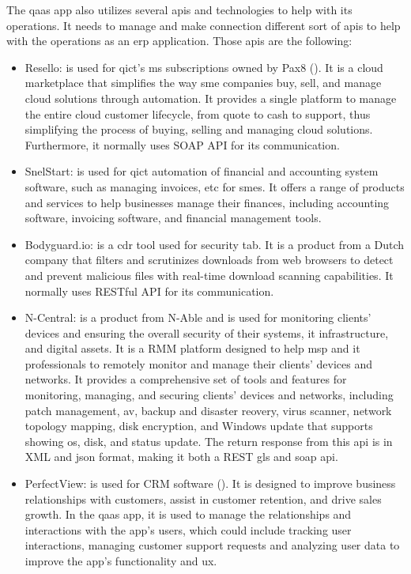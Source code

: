 The \acrshort{qaas} app also utilizes several \acrshort{api}s and technologies to help with its operations.
It needs to manage and make connection different sort of \acrshort{api}s to help with the operations as an
\acrshort{erp} application. Those \acrshort{api}s are the following:
\begin{itemize}
      \item Resello: is used for \acrshort{qict}'s \acrshort{ms} subscriptions owned by Pax8 (\textit{\cite{resello}}).
            It is a cloud marketplace that simplifies the way \acrshort{sme} companies buy, sell, and manage cloud solutions
            through automation. It provides a single platform to manage the entire cloud customer lifecycle, from
            quote to cash to support, thus simplifying the process of buying, selling and managing cloud
            solutions. Furthermore, it normally uses \gls{SOAP API} for its communication.
      \item SnelStart: is used for \acrshort{qict} automation of financial and accounting system software,
            such as managing invoices, \acrshort{etc} for \acrshort{sme}s. It offers a range of products and
            services to help businesses manage their finances, including accounting software, invoicing software, and financial management
            tools.
      \item Bodyguard.io: is a \acrshort{cdr} tool used for security tab. It is a product from a Dutch company
            that filters and scrutinizes downloads from web browsers to detect and prevent malicious files with
            real-time download scanning capabilities. It normally uses \gls{RESTful API} for its communication.
      \item N-Central: is a product from N-Able and is used for monitoring clients' devices and ensuring the
            overall security of their systems, \acrshort{it} infrastructure, and digital assets. It is a
            \gls{RMM} platform designed to help \acrshort{msp} and \acrshort{it} professionals to
            remotely monitor and manage their clients' devices and networks. It provides a comprehensive
            set of tools and features for monitoring, managing, and securing clients' devices and networks,
            including patch management, \acrshort{av}, backup and disaster reovery, virus scanner,
            network topology mapping, disk encryption, and Windows update that supports showing \acrshort{os},
            disk, and status update. The return response from this \acrshort{api} is in \gls{XML}
            and \acrshort{json} format, making it both a \gls{REST gls} and \acrshort{soap} \acrshort{api}.
      \item PerfectView: is used for \gls{CRM} software (\textit{\cite{perfectView}}). It is designed to
            improve business relationships with customers, assist in customer retention, and drive sales growth.
            In the \acrshort{qaas} app, it is used to manage the relationships and interactions with the app's users,
            which could include tracking user interactions, managing customer support requests and analyzing user
            data to improve the app's functionality and \acrshort{ux}.
\end{itemize}

